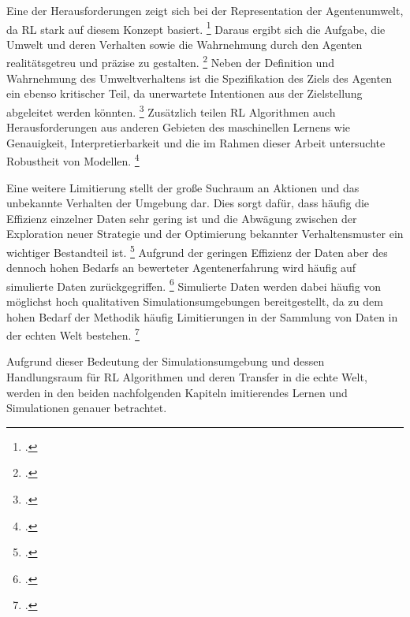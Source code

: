 Eine der Herausforderungen zeigt sich bei der Representation der Agentenumwelt, da RL stark auf diesem Konzept basiert. \footcite[Vgl.][S. 8]{Sutton.2018}
Daraus ergibt sich die Aufgabe, die Umwelt und deren Verhalten sowie die Wahrnehmung durch den Agenten realitätsgetreu und präzise zu gestalten. \footcite[Vgl.][S. 7]{Sutton.2018}
Neben der Definition und Wahrnehmung des Umweltverhaltens ist die Spezifikation des Ziels des Agenten ein ebenso kritischer Teil, da unerwartete Intentionen aus der Zielstellung abgeleitet werden könnten. \footcite[Vgl.][S. 7]{Li.2019}
Zusätzlich teilen RL Algorithmen auch Herausforderungen aus anderen Gebieten des maschinellen Lernens wie Genauigkeit, Interpretierbarkeit und die im Rahmen dieser Arbeit untersuchte Robustheit von Modellen. \footcite[Vgl.][S. 7]{Li.2019}

Eine weitere Limitierung stellt der große Suchraum an Aktionen und das unbekannte Verhalten der Umgebung dar.
Dies sorgt dafür, dass häufig die Effizienz einzelner Daten sehr gering ist und die Abwägung zwischen der Exploration neuer Strategie und der Optimierung bekannter Verhaltensmuster ein wichtiger Bestandteil ist. \footcite[Vgl.][S. 7]{Li.2019}
Aufgrund der geringen Effizienz der Daten aber des dennoch hohen Bedarfs an bewerteter Agentenerfahrung wird häufig auf simulierte Daten zurückgegriffen. \footcite[Vgl.][S. 7]{Zhao.2020}
Simulierte Daten werden dabei häufig von möglichst hoch qualitativen Simulationsumgebungen bereitgestellt, da zu dem hohen Bedarf der Methodik häufig Limitierungen in der Sammlung von Daten in der echten Welt bestehen. \footcite[Vgl.][S. 8]{Li.2019}

Aufgrund dieser Bedeutung der Simulationsumgebung und dessen Handlungsraum für RL Algorithmen und deren Transfer in die echte Welt, werden in den beiden nachfolgenden Kapiteln imitierendes Lernen und Simulationen genauer betrachtet.